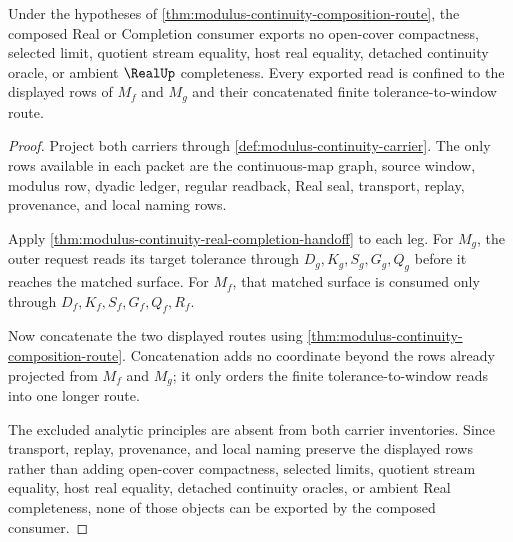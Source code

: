\begin{theorem}
\label{thm:modulus-continuity-composition-non-escape}
Under the hypotheses of \autoref{thm:modulus-continuity-composition-route}, the composed Real or Completion consumer exports no open-cover compactness, selected limit, quotient stream equality, host real equality, detached continuity oracle, or ambient $\RealUp$ completeness. Every exported read is confined to the displayed rows of $M_f$ and $M_g$ and their concatenated finite tolerance-to-window route.
\end{theorem}
\begin{proof}
Project both carriers through \autoref{def:modulus-continuity-carrier}. The only rows available in each packet are the continuous-map graph, source window, modulus row, dyadic ledger, regular readback, Real seal, transport, replay, provenance, and local naming rows.

Apply \autoref{thm:modulus-continuity-real-completion-handoff} to each leg. For $M_g$, the outer request reads its target tolerance through $D_g,K_g,S_g,G_g,Q_g$ before it reaches the matched surface. For $M_f$, that matched surface is consumed only through $D_f,K_f,S_f,G_f,Q_f,R_f$.

Now concatenate the two displayed routes using \autoref{thm:modulus-continuity-composition-route}. Concatenation adds no coordinate beyond the rows already projected from $M_f$ and $M_g$; it only orders the finite tolerance-to-window reads into one longer route.

The excluded analytic principles are absent from both carrier inventories. Since transport, replay, provenance, and local naming preserve the displayed rows rather than adding open-cover compactness, selected limits, quotient stream equality, host real equality, detached continuity oracles, or ambient Real completeness, none of those objects can be exported by the composed consumer.
\end{proof}

